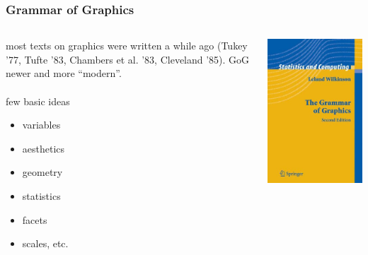 \documentclass{beamer}\usepackage{graphicx, color}
\begin{document}
\begin{frame}
  \frametitle{Grammar of Graphics}
  \begin{columns}
    \begin{column}{0.5\textwidth}
      most texts on graphics were written a while ago (Tukey '77, Tufte '83, Chambers et al. '83, Cleveland '85). GoG newer and more ``modern''.
      \\~\\
      few basic ideas
      \begin{itemize}
        \item variables
        \item aesthetics
        \item geometry
        \item statistics
        \item facets
        \item scales, etc.
      \end{itemize}
    \end{column}
    \begin{column}{0.5\textwidth}
      \includegraphics[width = \textwidth, keepaspectratio = true]{figure/grammar}
    \end{column}
  \end{columns}

\end{frame}
\end{document}
